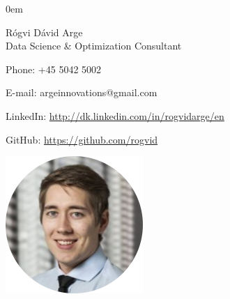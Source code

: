 \documentclass[10pt,a4paper]{article}
\begin{document}
\parindent0em
\begin{minipage}[t]{0.5\linewidth}
\vspace{-3.85cm}
{\Huge Rógvi Dávid Arge }\\

{\Large Data Science \& Optimization Consultant}
\vspace{0.3cm}

Phone: +45 5042 5002

\vspace{0.1cm}
E-mail: argeinnovations@gmail.com

\vspace{0.1cm}
LinkedIn: \url{http://dk.linkedin.com/in/rogvidarge/en}

\vspace{0.1cm}
GitHub: \url{https://github.com/rogvid}\\
\vspace{-1.6cm}
\end{minipage}\hspace{0.1cm}
\hfill\begin{minipage}[t]{0.3\linewidth}\raggedleft
    \includegraphics[width=0.7\columnwidth]{workpicture.png}
\end{minipage}
\end{document}
